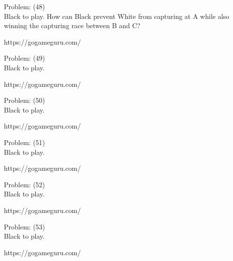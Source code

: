 \documentclass[11pt]{article}
\begin{document}
\begin{minipage}[t]{0.5\textwidth}
  {\centering
  
  Problem: (48)\\
  Black to play. How can Black prevent White from capturing at A while also winning the capturing race between B and C?

https://gogameguru.com/\\
  }
\end{minipage}
\begin{minipage}[t]{0.5\textwidth}
  {\centering
  
  Problem: (49)\\
  Black to play.

https://gogameguru.com/\\
  }
\end{minipage}
\begin{minipage}[t]{0.5\textwidth}
  {\centering
  
  Problem: (50)\\
  Black to play.

https://gogameguru.com/\\
  }
\end{minipage}
\begin{minipage}[t]{0.5\textwidth}
  {\centering
  
  Problem: (51)\\
  Black to play.

https://gogameguru.com/\\
  }
\end{minipage}
\begin{minipage}[t]{0.5\textwidth}
  {\centering
  
  Problem: (52)\\
  Black to play.

https://gogameguru.com/\\
  }
\end{minipage}
\begin{minipage}[t]{0.5\textwidth}
  {\centering
  
  Problem: (53)\\
  Black to play.

https://gogameguru.com/\\
  }
\end{minipage}
\end{document}
